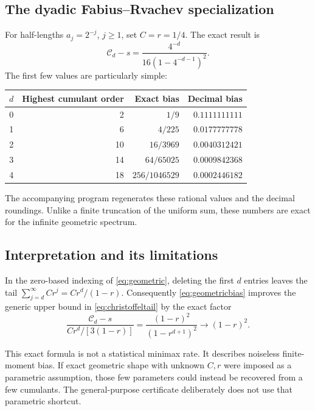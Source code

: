 \documentclass[11pt,letterpaper]{article}
\numberwithin{equation}{section}
\theoremstyle{definition}
\theoremstyle{remark}
\newcommand{\Cs}{\mathcal C}
\begin{document}
\subsection{The dyadic Fabius--Rvachev specialization}
For half-lengths $a_j=2^{-j}$, $j\ge1$, set $C=r=1/4$. The exact result is
\begin{equation}
 \Cs_d-s=\frac{4^{-d}}{16(1-4^{-d-1})^2}.
 \label{eq:dyadicbias}
\end{equation}
The first few values are particularly simple:
\begin{center}
\begin{tabular}{@{}rrrr@{}}
\toprule
$d$ & Highest cumulant order & Exact bias & Decimal bias \\\midrule
0 & 2  & $1/9$          & $0.1111111111$\\
1 & 6  & $4/225$        & $0.0177777778$\\
2 & 10 & $16/3969$      & $0.0040312421$\\
3 & 14 & $64/65025$     & $0.0009842368$\\
4 & 18 & $256/1046529$  & $0.0002446182$\\
\bottomrule
\end{tabular}
\end{center}
The accompanying program regenerates these rational values and the decimal
roundings. Unlike a finite truncation of the uniform sum, these numbers are
exact for the infinite geometric spectrum.

\subsection{Interpretation and its limitations}
In the zero-based indexing of \eqref{eq:geometric}, deleting the first $d$
entries leaves the tail $\sum_{j=d}^\infty Cr^j=Cr^d/(1-r)$.
Consequently \eqref{eq:geometricbias} improves the generic upper bound
in \eqref{eq:christoffeltail} by the exact factor
\begin{equation}
 \frac{\Cs_d-s}{Cr^d/[3(1-r)]}
 =\frac{(1-r)^2}{(1-r^{d+1})^2}\longrightarrow(1-r)^2.
 \label{eq:tailratio}
\end{equation}

This exact formula is not a statistical minimax rate. It describes noiseless
finite-moment bias. If exact geometric shape with unknown $C,r$ were imposed
as a parametric assumption, those few parameters could instead be recovered
from a few cumulants. The general-purpose certificate deliberately does not
use that parametric shortcut.
\end{document}
